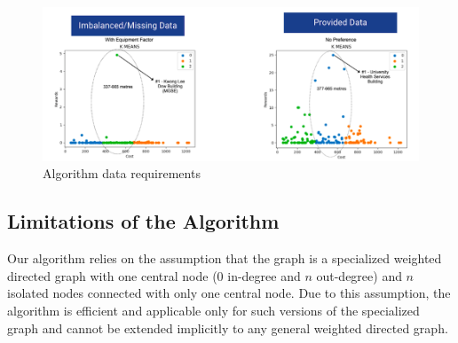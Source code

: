\begin{figure}[H]
\centering
\includegraphics[width=15cm]{resources/images/algo_data.png}
\caption{Algorithm data requirements}
\label{fig:algo-data-req}
\end{figure}

\subsection{Limitations of the Algorithm}

Our algorithm relies on the assumption that the graph is a specialized weighted directed graph with one central node ($0$ in-degree and $n$ out-degree) and $n$ isolated nodes connected with only one central node. Due to this assumption, the algorithm is efficient and applicable only for such versions of the specialized graph and cannot be extended implicitly to any general weighted directed graph.
